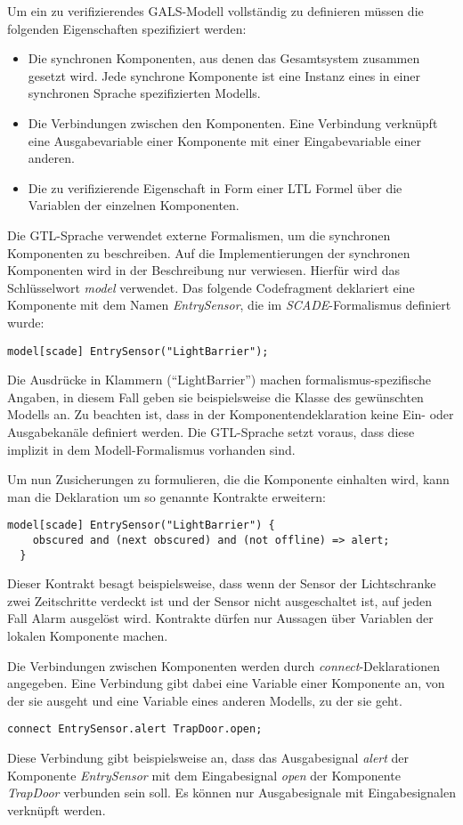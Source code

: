 Um ein zu verifizierendes GALS-Modell vollständig zu definieren müssen die folgenden Eigenschaften spezifiziert werden:
\begin{itemize}
\item Die synchronen Komponenten, aus denen das Gesamtsystem zusammen gesetzt wird.
  Jede synchrone Komponente ist eine Instanz eines in einer synchronen Sprache spezifizierten Modells.
\item Die Verbindungen zwischen den Komponenten.
  Eine Verbindung verknüpft eine Ausgabevariable einer Komponente mit einer Eingabevariable einer anderen.
\item Die zu verifizierende Eigenschaft in Form einer LTL Formel über die Variablen der einzelnen Komponenten.
\end{itemize}

Die GTL-Sprache verwendet externe Formalismen, um die synchronen Komponenten zu beschreiben.
Auf die Implementierungen der synchronen Komponenten wird in der Beschreibung nur verwiesen.
Hierfür wird das Schlüsselwort \emph{model} verwendet.
Das folgende Codefragment deklariert eine Komponente mit dem Namen \emph{EntrySensor}, die im \emph{SCADE}-Formalismus definiert wurde:
\begin{lstlisting}[language=gtl]
  model[scade] EntrySensor("LightBarrier");
\end{lstlisting}
Die Ausdrücke in Klammern ("`LightBarrier"') machen formalismus-spezifische Angaben, in diesem Fall geben sie beispielsweise die Klasse des gewünschten Modells an.
Zu beachten ist, dass in der Komponentendeklaration keine Ein- oder Ausgabekanäle definiert werden.
Die GTL-Sprache setzt voraus, dass diese implizit in dem Modell-Formalismus vorhanden sind.

Um nun Zusicherungen zu formulieren, die die Komponente einhalten wird, kann man die Deklaration um so genannte Kontrakte erweitern:
\begin{lstlisting}[language=gtl]
  model[scade] EntrySensor("LightBarrier") {
    obscured and (next obscured) and (not offline) => alert;
  }
\end{lstlisting}
Dieser Kontrakt besagt beispielsweise, dass wenn der Sensor der Lichtschranke zwei Zeitschritte verdeckt ist und der Sensor nicht ausgeschaltet ist, auf jeden Fall Alarm ausgelöst wird.
Kontrakte dürfen nur Aussagen über Variablen der lokalen Komponente machen.

Die Verbindungen zwischen Komponenten werden durch \emph{connect}-Deklarationen angegeben.
Eine Verbindung gibt dabei eine Variable einer Komponente an, von der sie ausgeht und eine Variable eines anderen Modells, zu der sie geht.
\begin{lstlisting}[language=gtl]
  connect EntrySensor.alert TrapDoor.open;
\end{lstlisting}
Diese Verbindung gibt beispielsweise an, dass das Ausgabesignal \emph{alert} der Komponente \emph{EntrySensor} mit dem Eingabesignal \emph{open} der Komponente \emph{TrapDoor} verbunden sein soll.
Es können nur Ausgabesignale mit Eingabesignalen verknüpft werden.

